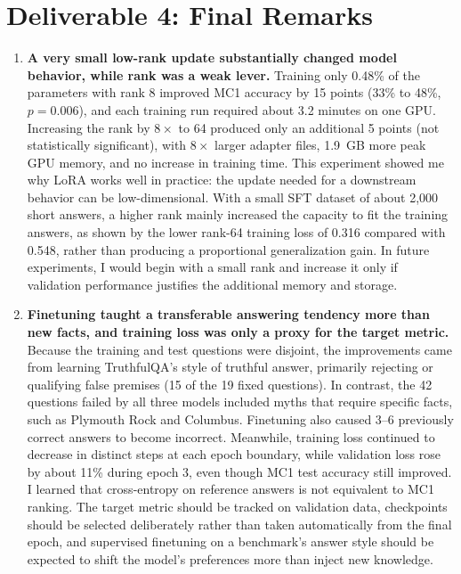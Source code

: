 \documentclass[11pt]{article}
\begin{document}
\section{Deliverable 4: Final Remarks}

\begin{enumerate}[label=\textbf{Point \arabic*:},leftmargin=*,itemsep=0.8em]
  \item \textbf{A very small low-rank update substantially changed model behavior, while rank was a weak lever.} Training only 0.48\% of the parameters with rank 8 improved MC1 accuracy by 15 points (33\% to 48\%, $p = 0.006$), and each training run required about 3.2 minutes on one GPU. Increasing the rank by $8\times$ to 64 produced only an additional 5 points (not statistically significant), with $8\times$ larger adapter files, 1.9~GB more peak GPU memory, and no increase in training time. This experiment showed me why LoRA works well in practice: the update needed for a downstream behavior can be low-dimensional. With a small SFT dataset of about 2,000 short answers, a higher rank mainly increased the capacity to fit the training answers, as shown by the lower rank-64 training loss of 0.316 compared with 0.548, rather than producing a proportional generalization gain. In future experiments, I would begin with a small rank and increase it only if validation performance justifies the additional memory and storage.
  \item \textbf{Finetuning taught a transferable answering tendency more than new facts, and training loss was only a proxy for the target metric.} Because the training and test questions were disjoint, the improvements came from learning TruthfulQA's style of truthful answer, primarily rejecting or qualifying false premises (15 of the 19 fixed questions). In contrast, the 42 questions failed by all three models included myths that require specific facts, such as Plymouth Rock and Columbus. Finetuning also caused 3--6 previously correct answers to become incorrect. Meanwhile, training loss continued to decrease in distinct steps at each epoch boundary, while validation loss rose by about 11\% during epoch 3, even though MC1 test accuracy still improved. I learned that cross-entropy on reference answers is not equivalent to MC1 ranking. The target metric should be tracked on validation data, checkpoints should be selected deliberately rather than taken automatically from the final epoch, and supervised finetuning on a benchmark's answer style should be expected to shift the model's preferences more than inject new knowledge.

\end{enumerate}
\end{document}
